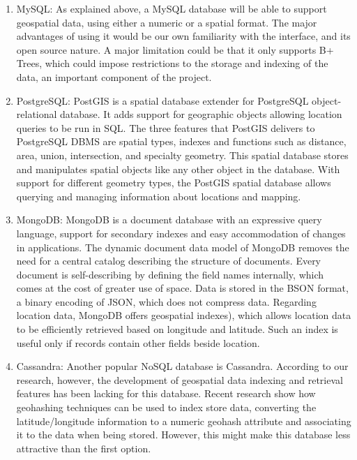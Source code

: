 \documentclass[conference]{IEEEtran}
\begin{document}
\begin{enumerate}

\item MySQL: As explained above, a MySQL database will be able to support geospatial data, using either a numeric or a spatial format. The major advantages of using it would be our own familiarity with the interface, and its open source nature. A major limitation could be that it only supports B+ Trees, which could impose restrictions to the storage and indexing of the data, an important component of the project. 

\item PostgreSQL: PostGIS is a spatial database extender for PostgreSQL object-relational database. It adds support for geographic objects allowing location queries to be run in SQL. The three features that PostGIS delivers to PostgreSQL DBMS are spatial types, indexes and functions such as distance, area, union, intersection, and specialty geometry. This spatial database stores and manipulates spatial objects like any other object in the database. With support for different geometry types, the PostGIS spatial database allows querying and managing information about locations and mapping.

\item MongoDB: MongoDB is a document database with an expressive query language, support for secondary indexes and easy accommodation of changes in applications. The dynamic document data model of MongoDB removes the need for a central catalog describing the structure of documents. Every document is self-describing by defining the field names internally, which comes at the cost of greater use of space. Data is stored in the BSON format, a binary encoding of JSON, which does not compress data. 
Regarding location data, MongoDB offers geospatial indexes), which allows location data to be efficiently retrieved based on longitude and latitude. Such an index is useful only if records contain other fields beside location.
 
\item Cassandra: Another popular NoSQL database is Cassandra. According to our research, however, the development of geospatial data indexing and retrieval features has been lacking for this database.  Recent research show how geohashing techniques can be used to index store data, converting the latitude/longitude information to a numeric geohash attribute and associating it to the data when being stored. However, this might make this database less attractive than the first option. 

\end{enumerate}
\end{document}
